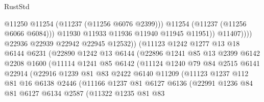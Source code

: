 \begin{lexlean}{RustStd}
\begin{coremodule}
                                    @11250
                                    @11254
                                    (@11237 (@11256 @6076 @2399)))
                                  @11254
                                  (@11237 (@11256 @6066 @6084)))
                                @11930
                                @11933
                                @11936
                                @11940
                                @11945
                                @11951))
                            @11407))))
                    @22936
                    @22939
                    @22942
                    @22945
                    @12532))
                (@11123
                  @1242
                  @1277
                  @13
                  @18
                  @6144
                  @6231
                  (@22890
                    @1242
                    @13
                    @6144
                    (@22896
                      @1241
                      @85
                      @13
                      @2399
                      @6142
                      @2208
                      @1600
                      (@11114
                        @1241
                        @85
                        @6142
                        (@11124
                          @1240
                          @79
                          @84
                          @2515
                          @6141
                          @22914
                          (@22916
                            @1239
                            @81
                            @83
                            @2422
                            @6140
                            @11209
                            (@11123
                              @1237
                              @112
                              @81
                              @16
                              @6138
                              @2446
                              (@11166
                                @1237
                                @81
                                @6127
                                @6136
                                (@22991
                                  @1236
                                  @84
                                  @81
                                  @6127
                                  @6134
                                  @2587
                                  (@11322
                                    @1235
                                    @81
                                    @83

\end{coremodule}
\end{lexlean}
